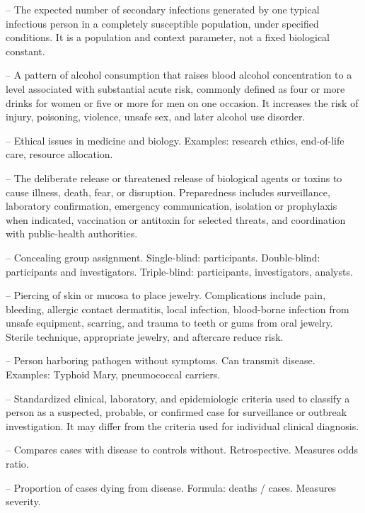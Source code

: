 -- The expected number of secondary infections generated by one typical infectious person in a completely susceptible population, under specified conditions. It is a population and context parameter, not a fixed biological constant.

-- A pattern of alcohol consumption that raises blood alcohol concentration to a level associated with substantial acute risk, commonly defined as four or more drinks for women or five or more for men on one occasion. It increases the risk of injury, poisoning, violence, unsafe sex, and later alcohol use disorder.

-- Ethical issues in medicine and biology. Examples: research ethics, end-of-life care, resource allocation.

-- The deliberate release or threatened release of biological agents or toxins to cause illness, death, fear, or disruption. Preparedness includes surveillance, laboratory confirmation, emergency communication, isolation or prophylaxis when indicated, vaccination or antitoxin for selected threats, and coordination with public-health authorities.

-- Concealing group assignment. Single-blind: participants. Double-blind: participants and investigators. Triple-blind: participants, investigators, analysts.

-- Piercing of skin or mucosa to place jewelry. Complications include pain, bleeding, allergic contact dermatitis, local infection, blood-borne infection from unsafe equipment, scarring, and trauma to teeth or gums from oral jewelry. Sterile technique, appropriate jewelry, and aftercare reduce risk.

-- Person harboring pathogen without symptoms. Can transmit disease. Examples: Typhoid Mary, pneumococcal carriers.

-- Standardized clinical, laboratory, and epidemiologic criteria used to classify a person as a suspected, probable, or confirmed case for surveillance or outbreak investigation. It may differ from the criteria used for individual clinical diagnosis.

-- Compares cases with disease to controls without. Retrospective. Measures odds ratio.



-- Proportion of cases dying from disease. Formula: deaths / cases. Measures severity.


